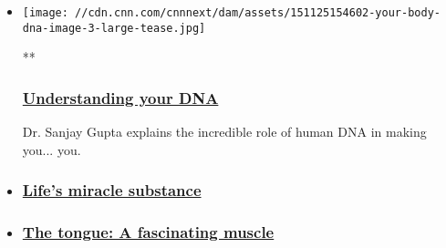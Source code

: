 \begin{itemize}
\item
  \href{/videos/health/2015/11/25/orig-your-body-dna-ms.cnn}{}

  \texttt{[image: //cdn.cnn.com/cnnnext/dam/assets/151125154602-your-body-dna-image-3-large-tease.jpg]}

  **

  \hypertarget{understanding-your-dna}{%
  \subsubsection{\texorpdfstring{\href{/videos/health/2015/11/25/orig-your-body-dna-ms.cnn}{Understanding
  your DNA}}{Understanding your DNA}}\label{understanding-your-dna}}

  Dr. Sanjay Gupta explains the incredible role of human DNA in making
  you... you.
\item
  \hypertarget{lifes-miracle-substance}{%
  \subsubsection{\texorpdfstring{\href{/videos/health/2015/11/25/orig-your-body-the-ultimate-guide-blood.cnn}{Life's
  miracle
  substance}}{Life's miracle substance}}\label{lifes-miracle-substance}}
\item
  \hypertarget{the-tongue-a-fascinating-muscle}{%
  \subsubsection{\texorpdfstring{\href{/videos/health/2015/11/25/cnn-orig-your-body-tongue-sanjay-gupta.cnn}{The
  tongue: A fascinating
  muscle}}{The tongue: A fascinating muscle}}\label{the-tongue-a-fascinating-muscle}}
\end{itemize}

